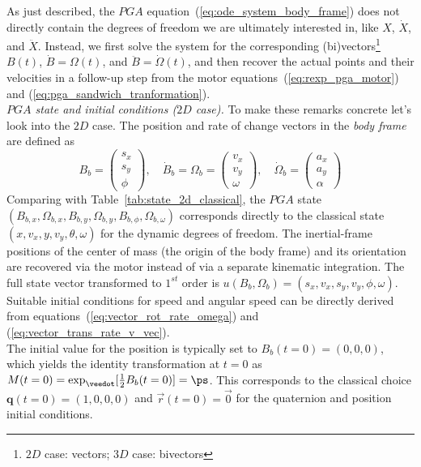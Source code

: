 As just described, the $PGA$ equation~(\ref{eq:ode_system_body_frame}) does not directly
contain the degrees of freedom we are ultimately interested in, like $X$, $\dot{X}$, and
$\ddot{X}$. Instead, we first solve the system for the corresponding
(bi)vectors\footnote{$2D$ case: vectors; $3D$ case: bivectors} $B(t)$, $\dot{B} =
\Omega(t)$, and $\ddot{B} = \dot{\Omega}(t)$, and then recover the actual points and their
velocities in a follow-up step from the motor equations~(\ref{eq:rexp_pga_motor}) and
(\ref{eq:pga_sandwich_tranformation}).\\

\emph{$PGA$ state and initial conditions ($2D$ case).}
To make these remarks concrete let's look into the $2D$ case. The position and rate of
change vectors in the \emph{body frame} are defined as
\begin{equation}
    B_b = \begin{pmatrix}
        s_x \\ s_y \\ \phi
    \end{pmatrix}
    ,\quad
     \dot{B}_b = \Omega_b = \begin{pmatrix}
        v_x \\ v_y \\ \omega
    \end{pmatrix}
    ,\quad
     \dot{\Omega}_b = \begin{pmatrix}
        a_x \\ a_y \\ \alpha
    \end{pmatrix}
\end{equation}
Comparing with Table~\ref{tab:state_2d_classical}, the $PGA$ state $(B_{b,x},
\Omega_{b,x}, B_{b,y}, \Omega_{b,y}, B_{b,\phi}, \Omega_{b,\omega})$ corresponds directly
to the classical state $(x,v_x,y, v_y,\theta, \omega)$ for the dynamic degrees of freedom.
The inertial-frame positions of the center of mass (the origin of the body frame) and its
orientation are recovered via the motor instead of via a separate kinematic integration.
The full state vector transformed to $1^{st}$ order is $u(B_b,\Omega_b) = (s_x, v_x, s_y,
v_y, \phi, \omega)$. Suitable initial conditions for speed and angular speed can be
directly derived from equations~(\ref{eq:vector_rot_rate_omega}) and
(\ref{eq:vector_trans_rate_v_vec}). \\

The initial value for the position is typically set to $B_b(t=0) = (0, 0, 0)$, which
yields the identity transformation at $t=0$ as $M(t=0) = \exp_\veedot[\frac{1}{2}
B_b(t=0)] = \ps$. This corresponds to the classical choice $\mathbf{q}(t=0) = (1, 0, 0,
0)$ and $\vec{r}(t=0) = \vec{0}$ for the quaternion and position initial conditions.\\

